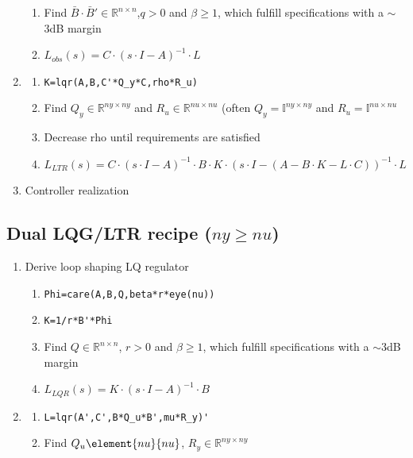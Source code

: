 \documentclass[10pt,a4paper]{scrartcl}
\begin{document}
\begin{multicols*}{3}
\begin{enumerate}[leftmargin=*]
\begin{enumerate}[leftmargin=*]
	
	\item
	Find $\bar{B}\cdot\bar{B}'\in\mathbb{R}^{n\times n}$,$q>0$ and $\beta\geq 1$, which fulfill specifications with a $\sim$3dB margin
	\item
	$L_{obs}(s)=C\cdot(s\cdot I-A)^{-1}\cdot L$
	\end{enumerate}
	\item 
	\begin{enumerate}[leftmargin=*]
	\compaq
	\item
	\verb+K=lqr(A,B,C'*Q_y*C,rho*R_u)+
	\item
	Find $Q_y\in\mathbb{R}^{ny\times ny}$ and $R_u\in\mathbb{R}^{nu\times nu}$ (often $Q_y=\mathbb{I}^{ny\times ny}$ and $R_u = \mathbb{I}^{nu\times nu}$
	\item Decrease rho until requirements are satisfied
	\item \footnotesize $L_{LTR}(s)=C\cdot(s\cdot I-A)^{-1}\cdot B\cdot K\cdot (s\cdot I-(A-B\cdot K-L\cdot C))^{-1}\cdot L$\normalsize
	\end{enumerate}
	\item
	Controller realization
	\end{enumerate}
	
	
	\subsection*{Dual LQG/LTR recipe ($ny\geq nu$)}
	
	\begin{enumerate}
	\compaq
	\setcounter{enumi}{4}
	\item
	Derive loop shaping LQ regulator
	
	
	\begin{enumerate}[leftmargin=*]
	\compaq
	\item
	\verb+Phi=care(A,B,Q,beta*r*eye(nu))+
	
	\item
	\verb+K=1/r*B'*Phi+
	\item
	Find $Q\in\mathbb{R}^{n\times n}$, $r>0$ and $\beta \geq 1$, which fulfill specifications with a $\sim$3dB margin
	\item $L_{LQR}(s)=K\cdot(s\cdot I-A)^{-1}\cdot B$
	\end{enumerate}
	\item
	\begin{enumerate}[leftmargin=*]
	\compaq
	\item
	\verb+L=lqr(A',C',B*Q_u*B',mu*R_y)'+
	\item 
	Find $Q_u\element{nu}{nu}$, $R_y\in\mathbb{R}^{ny\times ny}$ 
	

\end{enumerate}
\end{enumerate}
\end{multicols*}
\end{document}
